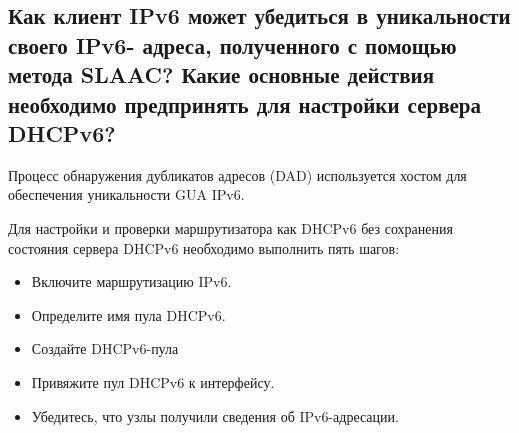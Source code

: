 \subsection{Как клиент IPv6 может убедиться в уникальности своего IPv6-
адреса, полученного с помощью метода SLAAC? Какие
основные действия необходимо предпринять для настройки
сервера DHCPv6?}
Процесс обнаружения дубликатов адресов (DAD) используется хостом
для обеспечения уникальности GUA IPv6.

Для настройки и проверки маршрутизатора как DHCPv6 без
сохранения состояния сервера DHCPv6 необходимо выполнить пять шагов:
\begin{itemize}
    \item Включите маршрутизацию IPv6.
    \item Определите имя пула DHCPv6.
    \item Создайте DHCPv6-пула
    \item Привяжите пул DHCPv6 к интерфейсу.
    \item Убедитесь, что узлы получили сведения об IPv6-адресации.
\end{itemize}